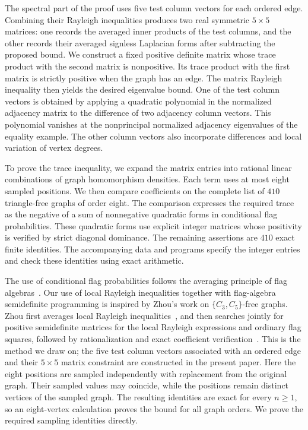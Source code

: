 \documentclass[11pt]{article}
\begin{document}
The spectral part of the proof uses five test column vectors for each ordered
edge. Combining their Rayleigh inequalities produces two real symmetric
$5\times5$ matrices: one records the averaged inner products of the test
columns, and the other records their averaged signless Laplacian forms
after subtracting the proposed bound. We construct a fixed positive
definite matrix whose trace product with the second matrix is
nonpositive. Its trace product with the first matrix is strictly positive
when the graph has an edge. The matrix Rayleigh inequality then yields
the desired eigenvalue bound. One of the test column vectors is obtained by
applying a quadratic polynomial in the normalized adjacency matrix to
the difference of two adjacency column vectors. This polynomial vanishes at
the nonprincipal normalized adjacency eigenvalues of the equality
example. The other column vectors also incorporate differences and local
variation of vertex degrees.

To prove the trace inequality, we expand the matrix entries into rational
linear combinations of graph homomorphism densities. Each term uses at
most eight sampled positions. We then compare coefficients on the
complete list of $410$ triangle-free graphs of order eight. The
comparison expresses the required trace as the negative of a sum of
nonnegative quadratic forms in conditional flag probabilities. These
quadratic forms use explicit integer matrices whose positivity is
verified by strict diagonal dominance. The remaining assertions are
$410$ exact finite identities. The accompanying data and programs
specify the integer entries and check these identities using exact
arithmetic.

The use of conditional flag probabilities follows the averaging principle
of flag algebras~\cite{Razborov}. Our use of local Rayleigh inequalities
together with flag-algebra semidefinite programming is inspired by Zhou's
work on $\{C_3,C_5\}$-free graphs. Zhou first averages local Rayleigh
inequalities~\cite[Lemma~2.1, pp.~4--5]{Zhou}, and then searches jointly
for positive semidefinite matrices for the local Rayleigh expressions and
ordinary flag squares, followed by rationalization and exact coefficient
verification~\cite[Section~2.3, p.~7]{Zhou}. This is the method we draw on;
the five test column vectors associated with an ordered edge and their
$5\times5$ matrix constraint are constructed in the present paper.
Here the eight positions are sampled
independently with replacement from the original graph. Their sampled
values may coincide, while the positions remain distinct vertices of
the sampled graph. The resulting identities are exact for every
$n\geq1$, so an eight-vertex calculation proves the bound for all graph
orders. We prove the required sampling identities directly.
\end{document}
